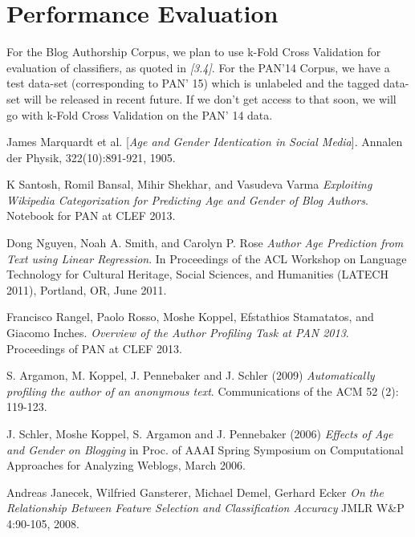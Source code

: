 \documentclass{sig-alternate}
\begin{document}
\section{Performance Evaluation}
For the Blog Authorship Corpus, we plan to use k-Fold Cross Validation for evaluation of classifiers, as quoted in \textit{[3.4]}.
For the PAN'14 Corpus, we have a test data-set (corresponding to PAN' 15) which is unlabeled and the tagged data-set will be released in recent future. If we don't get access to that soon, we will go with k-Fold Cross Validation on the PAN' 14 data. 
\newpage
\begin{thebibliography}{9}
James Marquardt et al.
[\textit{Age and Gender Identication in Social Media}]. 
Annalen der Physik, 322(10):891-921, 1905.

K Santosh, Romil Bansal, Mihir Shekhar, and Vasudeva Varma
\textit{Exploiting Wikipedia Categorization for Predicting Age
and Gender of Blog Authors}. 
Notebook for PAN at CLEF 2013.

Dong Nguyen, Noah A. Smith, and Carolyn P. Rose
\textit{Author Age Prediction from Text using Linear Regression}. 
In Proceedings of the ACL Workshop on Language Technology for Cultural Heritage, Social Sciences, and Humanities (LATECH 2011), Portland, OR, June 2011.

Francisco Rangel, Paolo Rosso, Moshe Koppel, Efstathios Stamatatos, and Giacomo Inches. \textit{Overview of the Author Profiling Task at PAN 2013}. 
Proceedings of PAN at CLEF 2013.

S. Argamon, M. Koppel, J. Pennebaker and J. Schler (2009) 
\textit{Automatically profiling the author of an anonymous text}. 
Communications of the ACM 52 (2): 119-123.

J. Schler, Moshe Koppel, S. Argamon and J. Pennebaker (2006)
\textit{Effects of Age and Gender on Blogging} 
in Proc. of AAAI Spring Symposium on Computational Approaches for Analyzing Weblogs, March 2006.

Andreas Janecek, Wilfried Gansterer, Michael Demel, Gerhard Ecker
\textit{On the Relationship Between Feature Selection and Classification Accuracy} 
JMLR W\&P 4:90-105, 2008.

\end{thebibliography}
\end{document}
